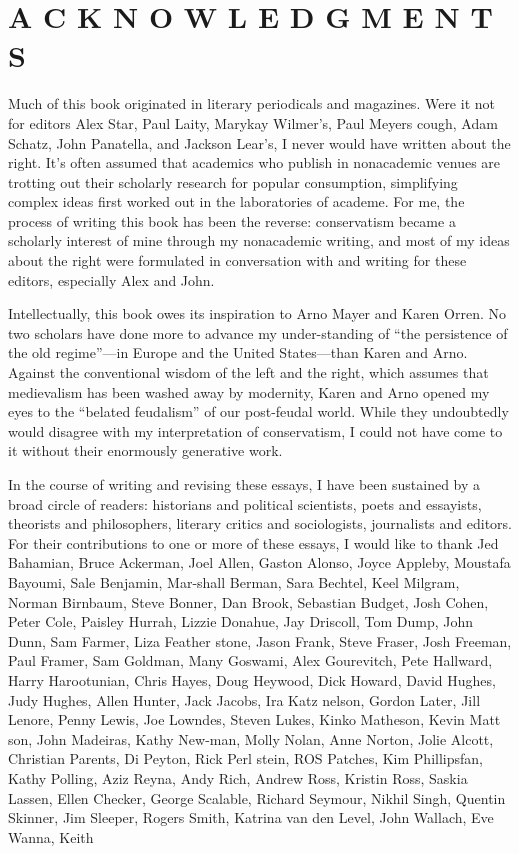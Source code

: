 {\chapter{A C K N O W L E D G M E N T S} } {\label{A C K N O W L E D G M E N T S} }{\par}{\textit{	} } {\par}{\par} {\textbf{\textit{	} } } {\par} 
	Much of this book originated in literary periodicals and magazines. Were it not for editors Alex Star, Paul Laity, Marykay Wilmer's, Paul Meyers cough, Adam Schatz, John Panatella, and Jackson Lear's, I never would have written about the right. It’s often assumed that academics who publish in nonacademic venues are trotting out their scholarly research for popular consumption, simplifying complex ideas first worked out in the laboratories of academe. For me, the process of writing this book has been the reverse: conservatism became a scholarly interest of mine through my nonacademic writing, and most of my ideas about the right were formulated in conversation with and writing for these editors, especially Alex and John.{\par} 	Intellectually, this book owes its inspiration to Arno Mayer and Karen Orren. No two scholars have done more to advance my under-standing of “the persistence of the old regime”—in Europe and the United States—than Karen and Arno. Against the conventional wisdom of the left and the right, which assumes that medievalism has been washed away by modernity, Karen and Arno opened my eyes to the “belated feudalism” of our post-feudal world. While they undoubtedly would disagree with my interpretation of conservatism, I could not have come to it without their enormously generative work.{\par} 	In the course of writing and revising these essays, I have been sustained by a broad circle of readers: historians and political scientists, poets and essayists, theorists and philosophers, literary critics and sociologists, journalists and editors. For their contributions to one or more of these essays, I would like to thank Jed Bahamian, Bruce Ackerman, Joel Allen, Gaston Alonso, Joyce Appleby, Moustafa Bayoumi, Sale Benjamin, Mar-shall Berman, Sara Bechtel, Keel Milgram, Norman Birnbaum, Steve Bonner, Dan Brook, Sebastian Budget, Josh Cohen, Peter Cole, Paisley Hurrah, Lizzie Donahue, Jay Driscoll, Tom Dump, John Dunn, Sam Farmer, Liza Feather stone, Jason Frank, Steve Fraser, Josh Freeman, Paul Framer, Sam Goldman, Many Goswami, Alex Gourevitch, Pete Hallward, Harry Harootunian, Chris Hayes, Doug Heywood, Dick Howard, David Hughes, Judy Hughes, Allen Hunter, Jack Jacobs, Ira Katz nelson, Gordon Later, Jill Lenore, Penny Lewis, Joe Lowndes, Steven Lukes, Kinko Matheson, Kevin Matt son, John Madeiras, Kathy New-man, Molly Nolan, Anne Norton, Jolie Alcott, Christian Parents, Di Peyton, Rick Perl stein, ROS Patches, Kim Phillipsfan, Kathy Polling, Aziz Reyna, Andy Rich, Andrew Ross, Kristin Ross, Saskia Lassen, Ellen Checker, George Scalable, Richard Seymour, Nikhil Singh, Quentin Skinner, Jim Sleeper, Rogers Smith, Katrina van den Level, John Wallach, Eve Wanna, Keith 